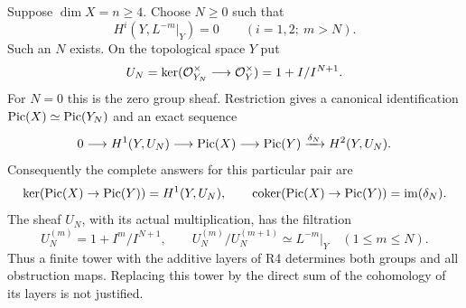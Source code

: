 \begin{theorem}\label{a:finite}
Suppose $\dim X=n\geq4$.  Choose $N\geq0$ such that
\[
 H^i(Y,L^{-m}|_Y)=0\qquad(i=1,2;\ m>N).
\]
Such an $N$ exists.  On the topological space $Y$ put
\[
 U_N=\ker(\mathcal O_{Y_N}^{\times}\longrightarrow\mathcal O_Y^{\times})
     =1+I/I^{N+1}.
\]
For $N=0$ this is the zero group sheaf.  Restriction gives a canonical
identification $\operatorname{Pic}(X)\simeq\operatorname{Pic}(Y_N)$ and an exact sequence
\begin{equation}\label{a:exact}
 0\longrightarrow H^1(Y,U_N)\longrightarrow\operatorname{Pic}(X)
 \longrightarrow\operatorname{Pic}(Y)\xrightarrow{\delta_N}H^2(Y,U_N).
\end{equation}
Consequently the complete answers for this particular pair are
\[
 \ker(\operatorname{Pic}(X)\to\operatorname{Pic}(Y))=H^1(Y,U_N),\qquad
 \operatorname{coker}(\operatorname{Pic}(X)\to\operatorname{Pic}(Y))=\operatorname{im}(\delta_N).
\]
The sheaf $U_N$, with its actual multiplication, has the filtration
\[
 U_N^{(m)}=1+I^m/I^{N+1},\qquad
 U_N^{(m)}/U_N^{(m+1)}\simeq L^{-m}|_Y\quad(1\leq m\leq N).
\]
Thus a finite tower with the additive layers of R4 determines both groups
and all obstruction maps.  Replacing this tower by the direct sum of the
cohomology of its layers is not justified.
\end{theorem}

